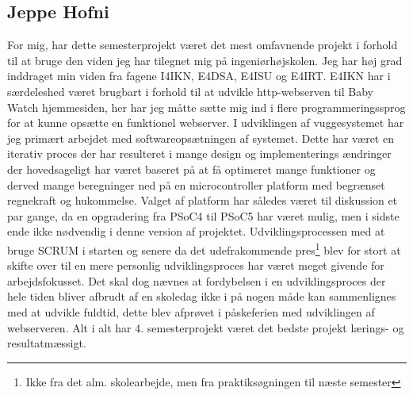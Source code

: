 \subsection*{Jeppe Hofni}
For mig, har dette semesterprojekt været det mest omfavnende projekt i forhold til at bruge den viden jeg har tilegnet mig på ingeniørhøjskolen. Jeg har høj grad inddraget min viden fra fagene I4IKN, E4DSA, E4ISU og E4IRT. E4IKN har i særdeleshed været brugbart i forhold til at udvikle http-webserven til Baby Watch hjemmesiden, her har jeg måtte sætte mig ind i flere programmeringssprog for at kunne opsætte en funktionel webserver. I udviklingen af vuggesystemet har jeg primært arbejdet med softwareopsætningen af systemet. Dette har været en iterativ proces der har resulteret i mange design og implementerings ændringer der hovedsageligt har været baseret på at få optimeret mange funktioner og derved mange beregninger ned på en microcontroller platform med begrænset regnekraft og hukommelse. Valget af platform har således været til diskussion et par gange, da en opgradering fra PSoC4 til PSoC5 har været mulig, men i sidste ende ikke nødvendig i denne version af projektet. Udviklingsprocessen med at bruge SCRUM i starten og senere da det udefrakommende pres\footnote{Ikke fra det alm. skolearbejde, men fra praktiksøgningen til næste semester} blev for stort at skifte over til en mere personlig udviklingsproces har været meget givende for arbejdsfokusset. Det skal dog nævnes at fordybelsen i en udviklingsproces der hele tiden bliver afbrudt af en skoledag ikke i på nogen måde kan sammenlignes med at udvikle fuldtid, dette blev afprøvet i påskeferien med udviklingen af webserveren. Alt i alt har 4. semesterprojekt været det bedste projekt lærings- og resultatmæssigt.